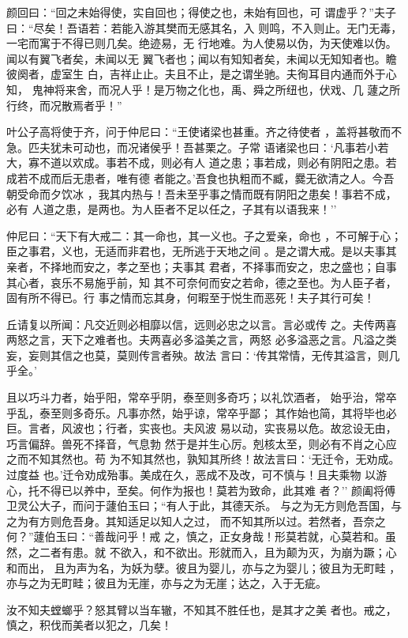 \documentclass[]{article}
\begin{document}
颜回曰：``回之未始得使，实自回也；得使之也，未始有回也，可
谓虚乎？''夫子曰：``尽矣！吾语若：若能入游其樊而无感其名，入
则鸣，不入则止。无门无毒，一宅而寓于不得已则几矣。绝迹易，无
行地难。为人使易以伪，为天使难以伪。闻以有翼飞者矣，未闻以无
翼飞者也；闻以有知知者矣，未闻以无知知者也。瞻彼阕者，虚室生
白，吉祥止止。夫且不止，是之谓坐驰。夫徇耳目内通而外于心知，
鬼神将来舍，而况人乎！是万物之化也，禹、舜之所纽也，伏戏、几
蘧之所行终，而况散焉者乎！''

叶公子高将使于齐，问于仲尼曰：``王使诸梁也甚重。齐之待使者
，盖将甚敬而不急。匹夫犹未可动也，而况诸侯乎！吾甚栗之。子常
语诸梁也曰：`凡事若小若大，寡不道以欢成。事若不成，则必有人
道之患；事若成，则必有阴阳之患。若成若不成而后无患者，唯有德
者能之。'吾食也执粗而不臧，爨无欲清之人。今吾朝受命而夕饮冰
，我其内热与！吾未至乎事之情而既有阴阳之患矣！事若不成，必有
人道之患，是两也。为人臣者不足以任之，子其有以语我来！''

仲尼曰：``天下有大戒二：其一命也，其一义也。子之爱亲，命也
，不可解于心；臣之事君，义也，无适而非君也，无所逃于天地之间
。是之谓大戒。是以夫事其亲者，不择地而安之，孝之至也；夫事其
君者，不择事而安之，忠之盛也；自事其心者，哀乐不易施乎前，知
其不可奈何而安之若命，德之至也。为人臣子者，固有所不得已。行
事之情而忘其身，何暇至于悦生而恶死！夫子其行可矣！

丘请复以所闻：凡交近则必相靡以信，远则必忠之以言。言必或传
之。夫传两喜两怒之言，天下之难者也。夫两喜必多溢美之言，两怒
必多溢恶之言。凡溢之类妄，妄则其信之也莫，莫则传言者殃。故法
言曰：`传其常情，无传其溢言，则几乎全。'

且以巧斗力者，始乎阳，常卒乎阴，泰至则多奇巧；以礼饮酒者，
始乎治，常卒乎乱，泰至则多奇乐。凡事亦然，始乎谅，常卒乎鄙；
其作始也简，其将毕也必巨。言者，风波也；行者，实丧也。夫风波
易以动，实丧易以危。故忿设无由，巧言偏辞。兽死不择音，气息勃
然于是并生心厉。剋核太至，则必有不肖之心应之而不知其然也。苟
为不知其然也，孰知其所终！故法言曰：`无迁令，无劝成。过度益
也。'迁令劝成殆事。美成在久，恶成不及改，可不慎与！且夫乘物
以游心，托不得已以养中，至矣。何作为报也！莫若为致命，此其难 者？''
颜阖将傅卫灵公大子，而问于蘧伯玉曰；``有人于此，其德天杀。
与之为无方则危吾国，与之为有方则危吾身。其知适足以知人之过，
而不知其所以过。若然者，吾奈之何？''蘧伯玉曰：``善哉问乎！戒
之，慎之，正女身哉！形莫若就，心莫若和。虽然，之二者有患。就
不欲入，和不欲出。形就而入，且为颠为灭，为崩为蹶；心和而出，
且为声为名，为妖为孽。彼且为婴儿，亦与之为婴儿；彼且为无町畦
，亦与之为无町畦；彼且为无崖，亦与之为无崖；达之，入于无疵。

汝不知夫螳螂乎？怒其臂以当车辙，不知其不胜任也，是其才之美
者也。戒之，慎之，积伐而美者以犯之，几矣！
\end{document}

